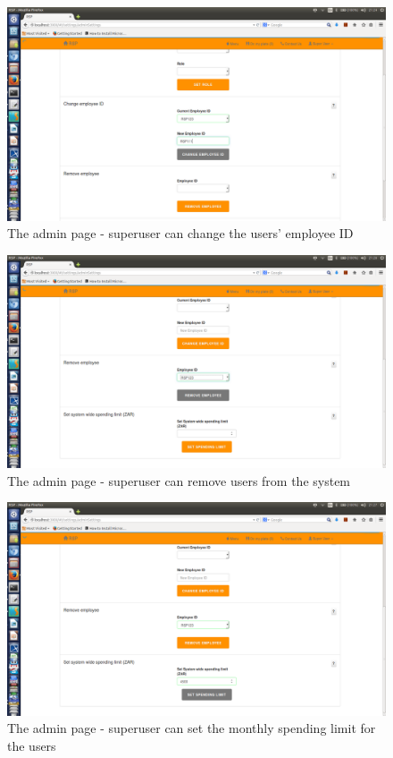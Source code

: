 \documentclass[a4paper,12pt]{article}
\begin{document}
\begin{figure}[H]
  \centering
    \includegraphics[width=1.0\textwidth]{screenshots/changeEmplid.png}
    \caption{The admin page - superuser can change the users' employee ID} 
\end{figure}

\begin{figure}[H]
  \centering
    \includegraphics[width=1.0\textwidth]{screenshots/removeUser.png}
    \caption{The admin page - superuser can remove users from the system} 
\end{figure}

\begin{figure}[H]
  \centering
    \includegraphics[width=1.0\textwidth]{screenshots/setLimit.png}
    \caption{The admin page - superuser can set the monthly spending limit for the users} 
\end{figure}
\end{document}
